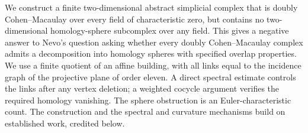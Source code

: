 We construct a finite two-dimensional abstract simplicial complex that is doubly
Cohen--Macaulay over every field of characteristic zero, but contains no
two-dimensional homology-sphere subcomplex over any field. This gives a negative
answer to Nevo's question asking whether every doubly Cohen--Macaulay complex
admits a decomposition into homology spheres with specified overlap properties.
We use a finite quotient of an affine building, with all links equal to the
incidence graph of the projective plane of order eleven. A direct spectral
estimate controls the links after any vertex deletion; a weighted cocycle
argument verifies the required homology vanishing. The sphere obstruction is
an Euler-characteristic count. The construction and the spectral and curvature
mechanisms build on established work, credited below.
